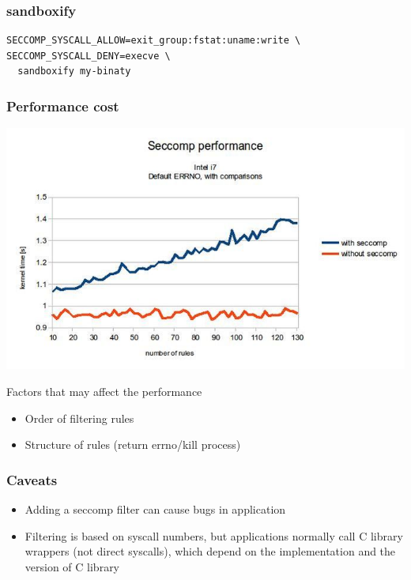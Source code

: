 \documentclass[usenames,dvipsnames]{beamer}
\begin{document}
\begin{frame}[fragile]
\frametitle{sandboxify}
\begin{verbatim}
SECCOMP_SYSCALL_ALLOW=exit_group:fstat:uname:write \
SECCOMP_SYSCALL_DENY=execve \
  sandboxify my-binaty
\end{verbatim}
\end{frame}

\begin{frame}[fragile]
\frametitle{Performance cost}
\centering
\includegraphics[scale=0.3]{images/672px-Seccomp_i7_extended_errno.jpg}

\raggedright

Factors that may affect the performance
  \begin{itemize}
    \item Order of filtering rules
    \item Structure of rules (return errno/kill process)
  \end{itemize}
\end{frame}

\begin{frame}
\frametitle{Caveats}
\begin{itemize}
\item Adding a seccomp filter can cause bugs in application
\item Filtering is based on syscall numbers, but applications normally call C library wrappers (not direct syscalls), which depend on the implementation and the version of C library
\end{itemize}
\end{frame}
\end{document}
